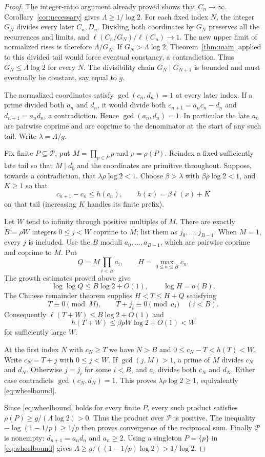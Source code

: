 \documentclass[11pt]{article}
\newcommand{\ellog}{\ell}
\begin{document}
\begin{proof}
The integer-ratio argument already proved shows that $C_n\to\infty$.
Corollary~\ref{cor:necessary} gives $\Lambda\ge1/\log2$.
For each fixed index $N$, the integer $G_N$ divides every later $C_n,D_n$.
Dividing both coordinates by $G_N$ preserves all the recurrences and
limits, and $\ellog(C_n/G_N)/\ellog(C_n)\to1$. The new upper limit
of normalized rises is therefore $\Lambda/G_N$. If
$G_N>\Lambda\log2$, Theorem~\ref{thm:main} applied to this divided tail
would force eventual constancy, a contradiction. Thus $G_N\le\Lambda\log2$
for every $N$. The divisibility chain $G_N\mid G_{N+1}$ is bounded and
must eventually be constant, say equal to $g$.

The normalized coordinates satisfy $\gcd(c_n,d_n)=1$ at every later
index. If a prime divided both $a_n$ and $d_n$, it would divide both
$c_{n+1}=a_nc_n-d_n$ and $d_{n+1}=a_nd_n$, a contradiction.
Hence $\gcd(a_n,d_n)=1$. In particular the late $a_n$ are pairwise
coprime and are coprime to the denominator at the start of any such tail.
Write $\lambda=\Lambda/g$.

Fix finite $P\subseteq\mathcal P$, put $M=\prod_{p\in P}p$ and
$\rho=\rho(P)$. Reindex a fixed sufficiently late tail so that
$M\mid d_0$ and the coordinates are primitive throughout.
Suppose, towards a contradiction, that $\lambda\rho\log2<1$.
Choose $\beta>\lambda$ with $\beta\rho\log2<1$, and $K\ge1$ so that
\[
 c_{n+1}-c_n\le h(c_n),\qquad h(x)=\beta\ellog(x)+K
\]
on that tail (increasing $K$ handles its finite prefix).

Let $W$ tend to infinity through positive multiples of $M$.
There are exactly $B=\rho W$ integers $0\le j<W$ coprime to $M$;
list them as $j_0,\ldots,j_{B-1}$. When $M=1$, every $j$ is included.
Use the $B$ moduli $a_0,\ldots,a_{B-1}$, which are pairwise coprime
and coprime to $M$. Put
\[
 Q=M\prod_{i<B}a_i,\qquad H=\max_{0\le n\le B}c_n.
\]
The growth estimates proved above give
\[
 \log\log Q\le B\log2+O(1),\qquad \log H=o(B).
\]
The Chinese remainder theorem supplies $H<T\le H+Q$ satisfying
\[
 T\equiv0\pmod M,\qquad T+j_i\equiv0\pmod{a_i}\quad(i<B).
\]
Consequently $\ellog(T+W)\le B\log2+O(1)$ and
\[
 h(T+W)\le\beta\rho W\log2+O(1)<W
\]
for sufficiently large $W$.

At the first index $N$ with $c_N\ge T$ we have $N>B$ and
$0\le c_N-T<h(T)<W$. Write $c_N=T+j$ with $0\le j<W$.
If $\gcd(j,M)>1$, a prime of $M$ divides $c_N$ and $d_N$.
Otherwise $j=j_i$ for some $i<B$, and $a_i$ divides both $c_N$ and $d_N$.
Either case contradicts $\gcd(c_N,d_N)=1$. This proves
$\lambda\rho\log2\ge1$, equivalently \eqref{eq:wheelbound}.

Since \eqref{eq:wheelbound} holds for every finite $P$, every such
product satisfies $\rho(P)\ge g/(\Lambda\log2)>0$. Thus the product
over $\mathcal P$ is positive. The inequality
$-\log(1-1/p)\ge1/p$ then proves convergence of the reciprocal sum.
Finally $\mathcal P$ is nonempty: $d_{n+1}=a_nd_n$ and $a_n\ge2$.
Using a singleton $P=\{p\}$ in \eqref{eq:wheelbound} gives
$\Lambda\ge g/((1-1/p)\log2)>1/\log2$.
\end{proof}
\end{document}
